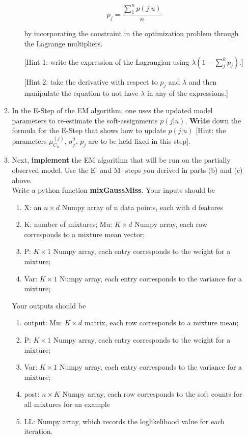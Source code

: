 \begin{enumerate}
\begin{enumerate}
\begin{enumerate}
$$ p_j = \frac{\sum^{n}_{1} p(j|u)}{n}$$

by incorporating the constraint in the optimization problem through the Lagrange multipliers.

[Hint 1: write the expression of the Lagrangian using $ \lambda (1 -\sum^{k}_{j} p_j) $.]

[Hint 2: take the derivative with respect to $p_j$ and $\lambda$ and then manipulate the equation to not have $\lambda$ in any of the expressions.]

\end{enumerate}

\item In the E-Step of the EM algorithm, one uses the updated model parameters to re-estimate  the soft-assignments $p(j|u)$. \textbf{Write} down the formula for the E-Step that shows how to update $p(j|u)$ [Hint: the parameters $\mu^{(j)}_{C_u}$, $\sigma^2_j$, $p_j$ are to be held fixed in this step].

\item Next, \textbf{implement} the EM algorithm that will be run on the partially observed model. Use the E- and M- steps you derived in parts (b) and (c) above.\\
    Write a python function \textbf{mixGaussMiss}. Your inputs should be
    \begin{enumerate}
    \item X: an $n \times d$ Numpy array of n data points, each with d features
    \item K: number of mixtures; Mu: $K \times d$ Numpy array, each row corresponds to a mixture mean vector;
    \item P: $K \times 1$ Numpy array, each entry corresponds to the weight for a mixture;
    \item Var: $K \times 1$ Numpy array, each entry corresponds to the variance for a mixture;
    \end{enumerate}
    Your outputs should be
    \begin{enumerate}
    \item output: Mu: $K \times d$ matrix, each row corresponds to a mixture mean;
    \item P: $K \times 1$ Numpy array, each entry corresponds to the weight for a mixture;
    \item Var: $K \times 1$ Numpy array, each entry corresponds to the variance for a mixture;
    \item post: $n \times K$ Numpy array, each row corresponds to the soft counts for all mixtures for an example
    \item LL: Numpy array, which records the loglikelihood value for each iteration.
    \end{enumerate}


\end{enumerate}
\end{enumerate}
